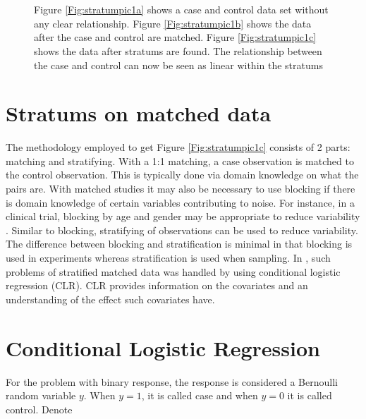 \documentclass[twoside,11pt]{article}
\begin{document}
\begin{figure}[htp]
  \begin{center}
     \\
     \\
  \end{center}
  \caption{Figure \ref{Fig:stratumpic1a} shows a case and control data set without any clear relationship. Figure \ref{Fig:stratumpic1b} shows the data after the case and control are matched. Figure \ref{Fig:stratumpic1c} shows the data after stratums are found. The relationship between the case and control can now be seen as linear within the stratums}
  \label{fig:stratumpic1}
\end{figure}

\section{Stratums on matched data}
The methodology employed to get Figure \ref{Fig:stratumpic1c} consists of 2 parts: matching and stratifying. With a 1:1 matching, a case observation is matched to the control observation. This is typically done via domain knowledge on what the pairs are. With matched studies it may also be necessary to use blocking if there is domain knowledge of certain variables contributing to noise. For instance, in a clinical trial, blocking by age and gender may be appropriate to reduce variability \citep{Crespo11}. Similar to blocking, stratifying of observations can be used to reduce variability. The difference between blocking and stratification is minimal in that blocking is used in experiments whereas stratification is used when sampling. In \citet{Hosmer00}, such problems of stratified matched data was handled by using conditional logistic regression (CLR). CLR provides information on the covariates and an understanding of the effect such covariates have.  

\section{Conditional Logistic Regression}\label{sec:clr}
For the problem with binary response, the response is considered a Bernoulli random variable $y$. When $y=1$, it is called case and when $y=0$ it is called control. Denote 
\end{document}
